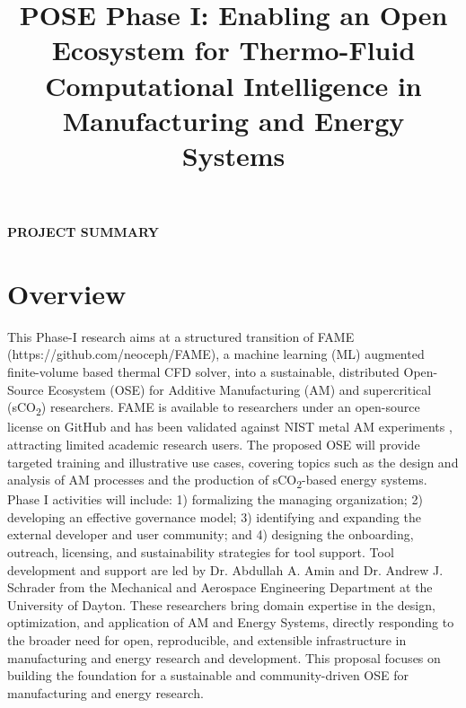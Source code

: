 \documentclass[11pt]{article}
\title{
    \vspace{-45pt}
    \fontsize{15pt}{18pt}\selectfont
    \textcolor{FlyersRed}
    {\textbf{POSE Phase I}: Enabling an Open Ecosystem for Thermo-Fluid Computational Intelligence in Manufacturing and Energy Systems}
}
\date{}
\author{}
\newcommand{\CO}[1]{CO\textsubscript{#1}}
\begin{document}
\pagestyle{empty} %
\vspace{-4\baselineskip}
\begin{center}
    \Large\textbf{\textcolor{FlyersRed}{PROJECT SUMMARY}}
\end{center}
\vspace{-1.4\baselineskip}


\section*{Overview}
\vspace{-3pt}
\noindent
This Phase-I research aims at a structured transition of FAME (https://github.com/neoceph/FAME), a machine learning (ML) augmented finite-volume based thermal CFD solver, into a sustainable, distributed Open-Source Ecosystem (OSE) for Additive Manufacturing (AM) and supercritical (s\CO{2})  researchers. FAME is available to researchers under an open-source license on GitHub and has been validated against NIST metal AM experiments \cite{aminPhysicsGuidedHeat2024}, attracting limited academic research users. The proposed OSE will provide targeted training and illustrative use cases, covering topics such as the design and analysis of AM processes and the production of s\CO{2}-based energy systems. Phase I activities will include: 1) formalizing the managing organization; 2) developing an effective governance model; 3) identifying and expanding the external developer and user community; and 4) designing the onboarding, outreach, licensing, and sustainability strategies for tool support. Tool development and support are led by Dr. Abdullah A. Amin and Dr. Andrew J. Schrader from the Mechanical and Aerospace Engineering Department at the University of Dayton. These researchers bring domain expertise in the design, optimization, and application of AM and Energy Systems, directly responding to the broader need for open, reproducible, and extensible infrastructure in manufacturing and energy research and development. This proposal focuses on building the foundation for a sustainable and community-driven OSE for manufacturing and energy research.
%
\vspace{-3pt}
\end{document}
